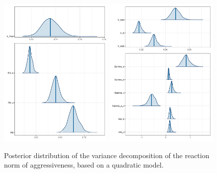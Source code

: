 \documentclass[a4paper,12pt,twoside]{article}
\begin{document}
\begin{figure}
  \includegraphics[width = 0.49\textwidth]{TPC_quadwithcs_plas_ds.pdf}
  \includegraphics[width = 0.49\textwidth]{TPC_quadwithcs_gen_ds.pdf}
  \caption{Posterior distribution of the variance decomposition of the reaction norm of aggressiveness, based on a quadratic model.}
  \label{fig_tpc_quadcs_var_decomp_ds}
\end{figure}
\end{document}
